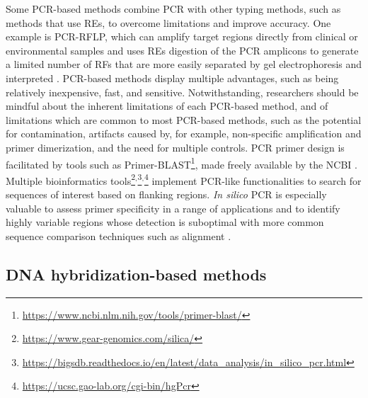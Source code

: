 Some \ac{PCR}-based methods combine \ac{PCR} with other typing methods, such as methods that use \ac{REs}, to overcome limitations and improve accuracy. One example is \ac{PCR}-\ac{RFLP}, which can amplify target regions directly from clinical or environmental samples and uses \ac{REs} digestion of the \ac{PCR} amplicons to generate a limited number of \ac{RFs} that are more easily separated by gel electrophoresis and interpreted \cite{wichelhaus_rapid_2001}.
\ac{PCR}-based methods display multiple advantages, such as being relatively inexpensive, fast, and sensitive. Notwithstanding, researchers should be mindful about the inherent limitations of each \ac{PCR}-based method, and of limitations which are common to most \ac{PCR}-based methods, such as the potential for contamination, artifacts caused by, for example, non-specific amplification and primer dimerization, and the need for multiple controls. \ac{PCR} primer design is facilitated by tools such as Primer-BLAST\footnote{\url{https://www.ncbi.nlm.nih.gov/tools/primer-blast/}}, made freely available by the \ac{NCBI} \cite{ye_primer-blast_2012}. Multiple bioinformatics tools\footnote{\url{https://www.gear-genomics.com/silica/}}$^{,}$\footnote{\url{https://bigsdb.readthedocs.io/en/latest/data_analysis/in_silico_pcr.html}}$^{,}$\footnote{\url{https://ucsc.gao-lab.org/cgi-bin/hgPcr}} implement \ac{PCR}-like functionalities to search for sequences of interest based on flanking regions. \textit{In silico} \ac{PCR} is especially valuable to assess primer specificity in a range of applications and to identify highly variable regions whose detection is suboptimal with more common sequence comparison techniques such as alignment \cite{kalendar_silico_2024}.

\subsection{DNA hybridization-based methods}

